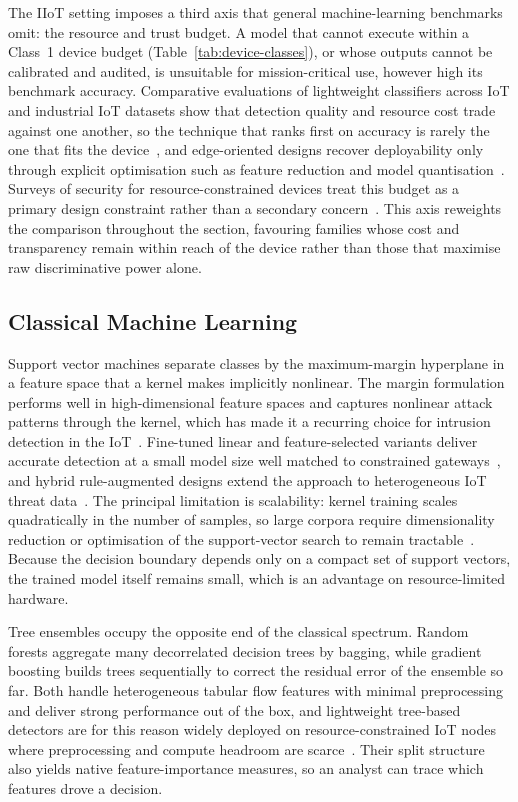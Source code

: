 The IIoT setting imposes a third axis that general machine-learning benchmarks
omit: the resource and trust budget. A model that cannot execute within a
Class~1 device budget (Table~\ref{tab:device-classes}), or whose outputs cannot
be calibrated and audited, is unsuitable for mission-critical use, however high
its benchmark accuracy. Comparative evaluations of lightweight classifiers
across IoT and industrial IoT datasets show that detection quality and resource
cost trade against one another, so the technique that ranks first on accuracy
is rarely the one that fits the device~\cite{ismail2025intrusion}, and
edge-oriented designs recover deployability only through explicit optimisation
such as feature reduction and model quantisation~\cite{tiwari2024lightweight}.
Surveys of security for resource-constrained devices treat this budget as a
primary design constraint rather than a secondary
concern~\cite{altaibek2025survey}. This axis reweights the comparison throughout
the section, favouring families whose cost and transparency remain within reach
of the device rather than those that maximise raw discriminative power alone.

\subsection{Classical Machine Learning}
\label{subsec:classical-ml}

Support vector machines separate classes by the maximum-margin hyperplane in a
feature space that a kernel makes implicitly nonlinear. The margin formulation
performs well in high-dimensional feature spaces and captures nonlinear attack
patterns through the kernel, which has made it a recurring choice for intrusion
detection in the IoT~\cite{sama2024cutting}. Fine-tuned linear and
feature-selected variants deliver accurate detection at a small model size well
matched to constrained gateways~\cite{azimjonov2024designing}, and hybrid
rule-augmented designs extend the approach to heterogeneous IoT threat
data~\cite{ashraf2024hybrid}. The principal limitation is scalability: kernel
training scales quadratically in the number of samples, so large corpora require
dimensionality reduction or optimisation of the support-vector search to remain
tractable~\cite{raghunath2025pca}. Because the decision boundary depends only on
a compact set of support vectors, the trained model itself remains small, which
is an advantage on resource-limited hardware.

Tree ensembles occupy the opposite end of the classical spectrum. Random forests
aggregate many decorrelated decision trees by bagging, while gradient boosting
builds trees sequentially to correct the residual error of the ensemble so far.
Both handle heterogeneous tabular flow features with minimal preprocessing and
deliver strong performance out of the box, and lightweight tree-based detectors
are for this reason widely deployed on resource-constrained IoT nodes where
preprocessing and compute headroom are
scarce~\cite{mishra2025lirad, pandey2025lightweight}. Their split structure also
yields native feature-importance measures, so an analyst can trace which
features drove a decision.

